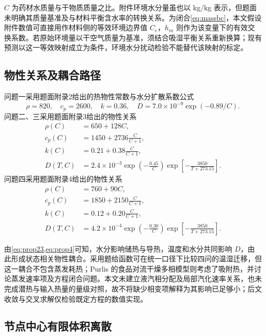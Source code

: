 $C$ 为药材水质量与干物质质量之比。附件环境水分量虽也以 kg/kg 表示，但题面未明确其质量基准及与材料平衡含水率的转换关系。为闭合\cref{eq:massbc}，本文假设附件数值可直接用作材料侧的等效环境边界值 $C_e$，$h_m$ 则作为该变量下的有效交换系数。若原始环境量以干空气质量为基准，须结合吸湿平衡关系重新换算；现有预测以这一等效映射成立为条件，环境水分扰动检验不能替代该映射的标定。

\subsection{物性关系及耦合路径}

问题一采用题面附录2给出的热物性常数与水分扩散系数公式
\begin{equation}
\rho=820,\quad c_p=2600,\quad k=0.36,\quad
D=7.0\times10^{-9}\exp(-0.89/C).
\label{eq:prop1}
\end{equation}
问题二、三采用题面附录3给出的物性关系
\begin{equation}
\begin{aligned}
\rho(C)&=650+128C,\\
c_p(C)&=1450+2736\frac{C}{C+1},\\
k(C)&=0.21+0.38\frac{C}{C+1},\\
D(T,C)&=2.4\times10^{-3}\exp\left(-\frac{0.45}{C}\right)
\exp\left[-\frac{3850}{T+273.15}\right].
\end{aligned}
\label{eq:prop23}
\end{equation}
问题四采用题面附录4给出的物性关系
\begin{equation}
\begin{aligned}
\rho(C)&=760+90C,\\
c_p(C)&=1850+2150\frac{C}{C+1},\\
k(C)&=0.12+0.20\frac{C}{C+1},\\
D(T,C)&=4.2\times10^{-4}\exp\left(-\frac{0.30}{C}\right)
\exp\left[-\frac{3850}{T+273.15}\right].
\end{aligned}
\label{eq:prop4}
\end{equation}

由\cref{eq:prop23,eq:prop4}可知，水分影响储热与导热，温度和水分共同影响 $D$，由此形成状态相关物性耦合。采用题给函数可在统一口径下比较四问的温湿迁移，但这一耦合不包含蒸发耗热；Purlis 的食品对流干燥多相模型则考虑了吸附热，并讨论蒸发速率项及方程闭合问题\cite{purlis2019}。本文未建立液汽相分配及局部汽化速率关系，也未完成潜热与输入热量的量级对照，故不将缺少相变项解释为其影响已足够小；后文收敛与交叉求解仅检验既定方程的数值实现。

\subsection{节点中心有限体积离散}

